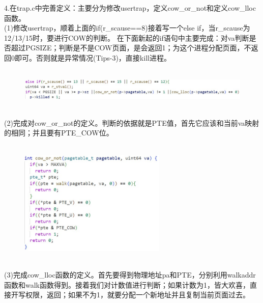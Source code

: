 \documentclass[12pt]{article}
\begin{document}
4.在trap.c中完善定义：主要分为修改usertrap，定义cow\_or\_not和定义cow\_lloc函数。\\
(1)修改usertrap，顺着上面的if(r\_scause==8)接着写一个else if，当r\_scause为12/13/15时，要进行COW的判断。
在下面新起的if语句中主要完成：对va判断是否超过PGSIZE；判断是不是COW页面，是会返回1；为这个进程分配页面，不返回0即可。否则就是异常情况(Tips-3)，直接kill进程。
\begin{figure}[H]
    \centering
    \includegraphics[height=2cm,width=13cm]{lab5-8.jpg}
\end{figure}

\noindent(2)完成对cow\_or\_not的定义。判断的依据就是PTE值，首先它应该和当前va映射的相同；并且要有PTE\_COW位。
\newpage
\begin{figure}[H]
    \centering
    \includegraphics[height=6cm,width=7cm]{lab5-9.jpg}
\end{figure}
\noindent(3)完成cow\_lloc函数的定义。首先要得到物理地址pa和PTE，分别利用walkaddr函数和walk函数得到。接着我们对计数值进行判断；如果计数为1，皆大欢喜，直接开写权限，返回；如果不为1，就要分配一个新地址并且复制当前页面过去。
\end{document}

